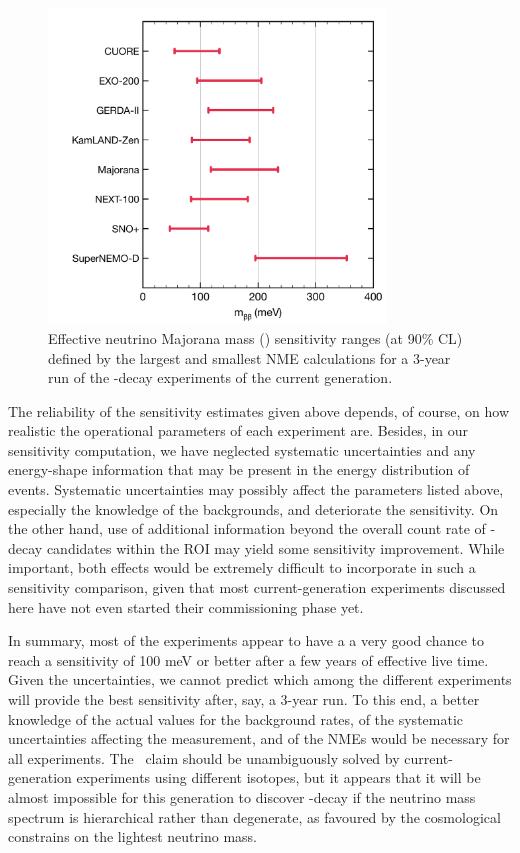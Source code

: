 \documentclass{PoS}
\begin{document}
\begin{figure}
\centering
\includegraphics[width=0.8\textwidth]{img/SensNMCurrentGen3YearsRun.pdf}
\caption{Effective neutrino Majorana mass (\mbb) sensitivity ranges (at 90\% CL) defined by the largest and smallest NME calculations for a 3-year run of the \bbonu-decay experiments of the current generation.} \label{fig:SensNMCurrentGen3YearsRun}
\end{figure}

The reliability of the sensitivity estimates given above depends, of course, on how realistic the operational parameters of each experiment are. Besides, in our sensitivity computation, we have neglected systematic uncertainties and any energy-shape information that may be present in the energy distribution of events. Systematic uncertainties may possibly affect the parameters listed above, especially the knowledge of the backgrounds, and deteriorate the sensitivity. On the other hand, use of additional information beyond the overall count rate of \bbonu-decay candidates within the ROI may yield some sensitivity improvement. While important, both effects would be extremely difficult to incorporate in such a sensitivity comparison, given that most current-generation experiments discussed here have not even started their commissioning phase yet.

In summary, most of the experiments appear to have a a very good chance to reach a sensitivity of 100 meV or better after a few years of effective live time. Given the uncertainties, we cannot predict which among the different experiments will provide the best sensitivity after, say, a 3-year run. To this end, a better knowledge of the actual values for the background rates, of the systematic uncertainties affecting the measurement, and of the NMEs would be necessary for all experiments. The \GE\ claim should be unambiguously solved by current-generation experiments using different isotopes, but it appears that it will be almost impossible for this generation to discover \bbonu-decay if the neutrino mass spectrum is hierarchical rather than degenerate, as favoured by the cosmological constrains on the lightest neutrino mass. 
\end{document}
